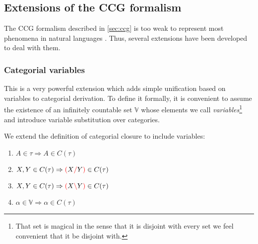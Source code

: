\documentclass[main.tex]{subfiles}
\begin{document}
\subsection{ Extensions of the CCG formalism}

The CCG formalism described in \ref{sec:ccg} is too weak to represent most
phenomena in natural languages \cite{steedman}. Thus, several extensions have
been developed to deal with them.

\subsubsection{Categorial variables}
This is a very powerful extension which adds simple unification based on variables
to categorial derivation. To define it formally, it is convenient to assume
the existence of an infinitely countable set $\mathbb{V}$ whose elements
we call \emph{variables}\footnote{That set is magical in the sense that it is
    disjoint with every set we feel convenient that it be disjoint with.}
and introduce variable substitution over categories.

\begin{defn}
    We extend the definition of categorial closure to include variables:
    \begin{enumerate}
        \item \label{itm:atomic} $A \in \tau \Rightarrow A \in C(\tau)$
        \item \label{itm:right}  $X, Y \in C(\tau) \Rightarrow \textcolor{red}{(} X \textcolor{red}{/} Y \textcolor{red}{)} \in C(\tau)$
        \item \label{itm:left}   $X, Y \in C(\tau) \Rightarrow \textcolor{red}{(} X \textcolor{red}{\backslash} Y \textcolor{red}{)} \in C(\tau)$
        \item \label{itm:var}    $\alpha \in \mathbb{V} \Rightarrow \alpha \in C(\tau)$
    \end{enumerate}
\end{defn}
\end{document}
